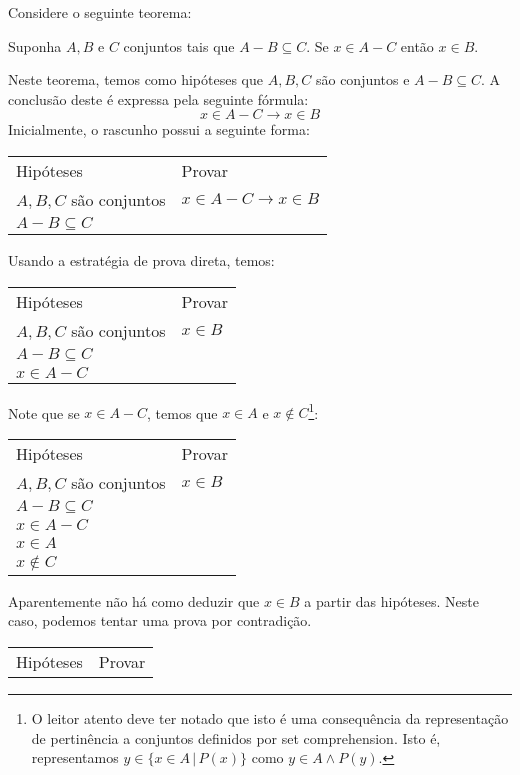 \begin{Example}
Considere o seguinte teorema:
\begin{flushleft}
Suponha $A,B$ e $C$ conjuntos tais que $A - B \subseteq C$. Se $x\in A
- C$ então $x \in B$.
\end{flushleft}
Neste teorema, temos como hipóteses que $A,B,C$ são conjuntos e $A - B
\subseteq C$. A conclusão deste é expressa pela seguinte fórmula:
\[
x\in A - C \to x\in B
\]
Inicialmente, o rascunho possui a seguinte forma:
\begin{flushleft}
\begin{tabular}{ll}
Hipóteses & Provar \\
$A,B,C$ são conjuntos & $x\in A - C \to x\in B$\\
 $A - B \subseteq C$
\end{tabular}
\end{flushleft}
Usando a estratégia de prova direta, temos:
\begin{flushleft}
\begin{tabular}{ll}
Hipóteses & Provar \\
$A,B,C$ são conjuntos & $x\in B$\\
 $A - B \subseteq C$ & \\
$x\in A - C$ & \\
\end{tabular}
\end{flushleft}
Note que se $x\in A- C$, temos que $x \in A$ e $x\not\in C$\footnote{O
leitor atento deve ter notado que isto é uma consequência da
representação de pertinência a conjuntos definidos por set
comprehension. Isto é, representamos $y\in\{x\in A\,|\, P(x)\}$ como
$y \in A \land P(y)$.}:
\begin{flushleft}
\begin{tabular}{ll}
Hipóteses & Provar \\
$A,B,C$ são conjuntos & $x\in B$\\
 $A - B \subseteq C$ & \\
$x\in A - C$ & \\
$x\in A$ & \\
$x\not\in C$ & \\
\end{tabular}
\end{flushleft}
Aparentemente não há como deduzir que $x\in B$ a partir das
hipóteses. Neste caso, podemos tentar uma prova por contradição.
\begin{flushleft}
\begin{tabular}{ll}
Hipóteses & Provar \\

\end{tabular}
\end{flushleft}
\end{Example}
